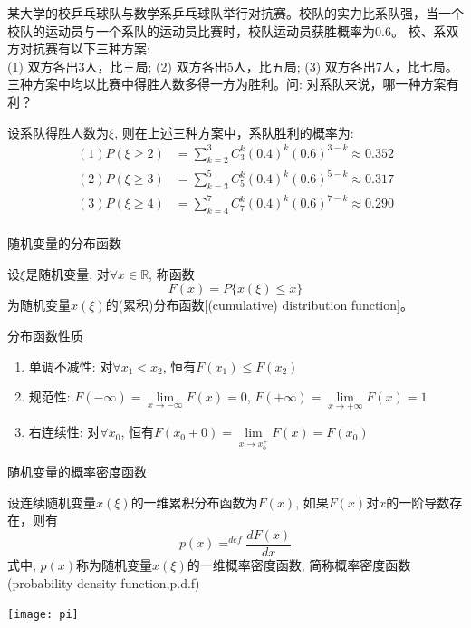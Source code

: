 \begin{frame}
某大学的校乒乓球队与数学系乒乓球队举行对抗赛。校队的实力比系队强，当一个校队的运动员与一个系队的运动员比赛时，校队运动员获胜概率为0.6。 校、系双方对抗赛有以下三种方案:\\
(1) 双方各出3人，比三局; (2) 双方各出5人，比五局; (3) 双方各出7人，比七局。\\
三种方案中均以比赛中得胜人数多得一方为胜利。问: 对系队来说，哪一种方案有利？
\begin{block}{}
	设系队得胜人数为$\xi$, 则在上述三种方案中，系队胜利的概率为:
	\begin{align*}
	(1) P(\xi\ge 2) &=\sum_{k=2}^{3}C_3^k(0.4)^k(0.6)^{3-k}\approx 0.352\\
    (2) P(\xi\ge 3) &=\sum_{k=3}^{5}C_5^k(0.4)^k(0.6)^{5-k}\approx 0.317\\
    (3) P(\xi\ge 4) &=\sum_{k=4}^{7}C_7^k(0.4)^k(0.6)^{7-k}\approx 0.290\\
	\end{align*}
\end{block}
\end{frame}

\begin{frame}{随机变量的分布函数}
\begin{definition}
	设$\xi$是随机变量, 对$\forall x\in\mathbb{R}$, 称函数
	\[F(x)=P\{x(\xi)\le x\}\]
	为随机变量$x(\xi)$的(累积)分布函数[(cumulative) distribution function]。
\end{definition}
\begin{block}{分布函数性质}
\begin{enumerate}
	\item 单调不减性: 对$\forall x_1<x_2$, 恒有$F(x_1)\le F(x_2)$
	\item 规范性: $F(-\infty)=\lim\limits_{x\to -\infty}F(x)=0$, $F(+\infty)=\lim\limits_{x\to +\infty}F(x)=1$
	\item 右连续性: 对$\forall x_0$, 恒有$F(x_0+0)=\lim\limits_{x\to x_0^+}F(x)=F(x_0)$
\end{enumerate}
\end{block}
\end{frame}

\begin{frame}{随机变量的概率密度函数}
\begin{definition}
	设连续随机变量$x(\xi)$的一维累积分布函数为$F(x)$, 如果$F(x)$对$x$的一阶导数存在，则有
	\[p(x)\mathop{=}^{def}\frac{dF(x)}{dx}\]
	式中, $p(x)$称为随机变量$x(\xi)$的一维概率密度函数, 简称概率密度函数(probability density function,p.d.f)
\end{definition}
\texttt{[image: pi]}
\end{frame}

